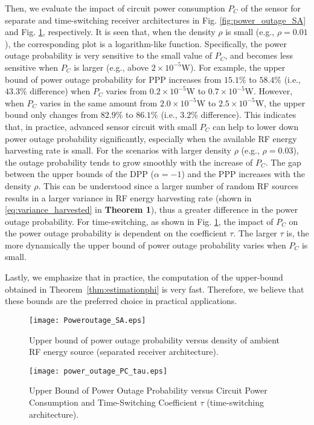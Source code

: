 \documentclass[12pt,draftclsnofoot,onecolumn]{IEEEtran}
\begin{document}
Then, we evaluate the impact of circuit power consumption $P_C$ of the sensor for separate and time-switching receiver architectures in Fig. \ref{fig:power_outage_SA} and Fig. \ref{fig:power_outage_PC_tau}, respectively. It is seen that, when the density $\rho$ is small (e.g., $\rho=0.01$), the corresponding plot is a logarithm-like function. Specifically, the power outage probability is very sensitive to the small value of $P_C$, and becomes less sensitive when $P_C$ is larger (e.g., above $2\times 10^{-5}$W). For example, the upper bound of power outage probability for PPP increases from $15.1\%$ to $58.4\%$ (i.e., $43.3\%$ difference) when $P_C$ varies from $0.2\times 10^{-5}$W to $0.7\times 10^{-5}$W. However, when $P_C$ varies in the same amount from $2.0\times 10^{-5}$W to $2.5\times 10^{-5}$W, the upper bound only changes from $82.9\%$ to $86.1\%$ (i.e., $3.2\%$ difference). This indicates that, in practice, advanced sensor circuit with small $P_C$ can help to lower down power outage probability significantly, especially when the available RF energy harvesting rate is small. For the scenarios with larger density $\rho$ (e.g., $\rho=0.03$), the outage probability tends to grow smoothly with the increase of $P_C$. The gap between the upper bounds of the DPP ($\alpha=-1$) and the PPP increases with the density $\rho$. This can be understood since a larger number of random RF sources results in a larger variance in RF energy harvesting rate (shown in \eqref{eq:variance_harvested} in {\bf Theorem 1}), thus a greater difference in the power outage probability. For time-switching, as shown in Fig. \ref{fig:power_outage_PC_tau}, the impact of $P_C$ on the power outage probability is dependent on the coefficient $\tau$. The larger $\tau$ is, the more dynamically the upper bound of power outage probability varies when $P_C$ is small. 

Lastly, we emphasize that in practice, the computation of the upper-bound obtained in Theorem~\ref{thm:estimationphi} is very fast. Therefore, we believe that these bounds are the preferred choice in practical applications.

 \begin{figure}
 \centering
  \begin{minipage}[c]{0.48\textwidth}
          \texttt{[image: Poweroutage\_SA.eps]}
           \caption{Upper bound of power outage probability versus density of ambient RF energy source (separated receiver architecture).}  \label{fig:power_outage_SA}          
    \end{minipage}
  \begin{minipage}[c]{0.48\textwidth}
          \texttt{[image: power\_outage\_PC\_tau.eps]}
            \caption{Upper Bound of Power Outage Probability versus Circuit Power Consumption and Time-Switching Coefficient $\tau$ (time-switching architecture).}   \label{fig:power_outage_PC_tau}     
  \end{minipage}
  \end{figure}
\end{document}
